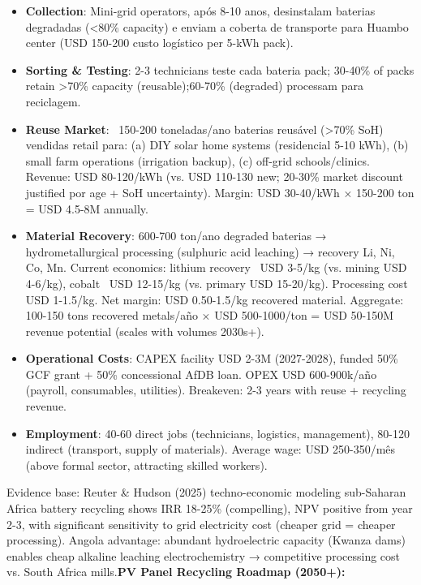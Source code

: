 \documentclass[12pt, a4paper]{article}
\begin{document}
\begin{itemize}
\item\textbf{Collection}: Mini-grid operators, após 8-10 anos, desinstalam baterias degradadas (<80\% capacity) e enviam a coberta de transporte para Huambo center (USD 150-200 custo logístico per 5-kWh pack).

\item\textbf{Sorting \& Testing}: 2-3 technicians teste cada bateria pack; 30-40\% of packs retain >70\% capacity (reusable);60-70\% (degraded) processam para reciclagem.

\item\textbf{Reuse Market}: ~150-200 toneladas/ano baterias reusável (>70\% SoH) vendidas retail para: (a) DIY solar home systems (residencial 5-10 kWh), (b) small farm operations (irrigation backup), (c) off-grid schools/clinics. Revenue: USD 80-120/kWh (vs. USD 110-130 new; 20-30\% market discount justified por age + SoH uncertainty). Margin: USD 30-40/kWh × 150-200 ton = USD 4.5-8M annually.

\item\textbf{Material Recovery}: 600-700 ton/ano degraded baterias → hydrometallurgical processing (sulphuric acid leaching) → recovery Li, Ni, Co, Mn. Current economics: lithium recovery ~USD 3-5/kg (vs. mining USD 4-6/kg), cobalt ~USD 12-15/kg (vs. primary USD 15-20/kg). Processing cost USD 1-1.5/kg. Net margin: USD 0.50-1.5/kg recovered material. Aggregate: 100-150 tons recovered metals/año × USD 500-1000/ton = USD 50-150M revenue potential (scales with volumes 2030s+).

\item\textbf{Operational Costs}: CAPEX facility USD 2-3M (2027-2028), funded 50\% GCF grant + 50\% concessional AfDB loan. OPEX USD 600-900k/año (payroll, consumables, utilities). Breakeven: 2-3 years with reuse + recycling revenue.

\item\textbf{Employment}: 40-60 direct jobs (technicians, logistics, management), 80-120 indirect (transport, supply of materials). Average wage: USD 250-350/mês (above formal sector, attracting skilled workers).
\end{itemize}

Evidence base: Reuter \& Hudson (2025) techno-economic modeling sub-Saharan Africa battery recycling shows IRR 18-25\% (compelling), NPV positive from year 2-3, with significant sensitivity to grid electricity cost (cheaper grid = cheaper processing). Angola advantage: abundant hydroelectric capacity (Kwanza dams) enables cheap alkaline leaching electrochemistry → competitive processing cost vs. South Africa mills.\textbf{PV Panel Recycling Roadmap (2050+):}
\end{document}
